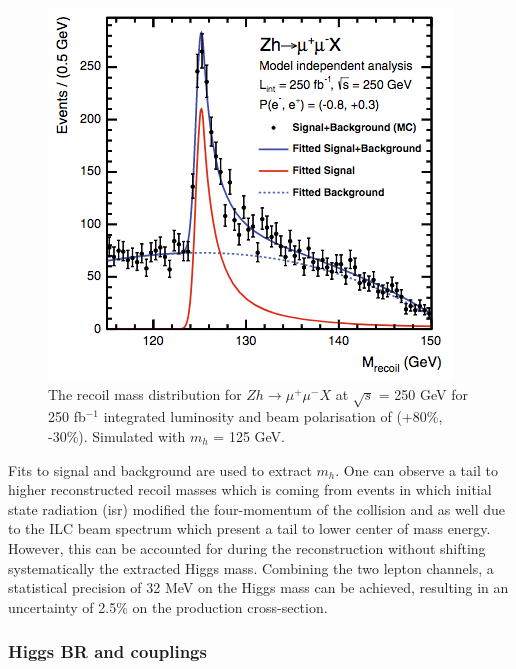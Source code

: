 \begin{figure}[htbp!]
  \centering
  \includegraphics[width=0.5\linewidth]{chap2/fig/HiggsRecoilMuMu.png}
  \caption{The recoil mass distribution for $Zh \rightarrow \mu^+\mu^-X$ at $\sqrt{s}$ = 250 GeV for 250 fb$^{-1}$ integrated luminosity and beam polarisation of (+80\%, -30\%). Simulated with $m_h$ = 125 GeV. \cite{Thomson2016}} \label{fig:HiggsRecoilMuMu}
\end{figure}

Fits to signal and background are used to extract $m_h$. One can observe a tail to higher reconstructed recoil masses which is coming from events in which initial state radiation (\acrshort{isr}) modified the four-momentum of the collision and as well due to the ILC beam spectrum which present a tail to lower center of mass energy. However, this can be accounted for during the reconstruction without shifting systematically the extracted Higgs mass. Combining the two lepton channels, a statistical precision of 32 MeV on the Higgs mass can be achieved, resulting in an uncertainty of 2.5\% on the production cross-section.

\subsubsection{Higgs BR and couplings}

